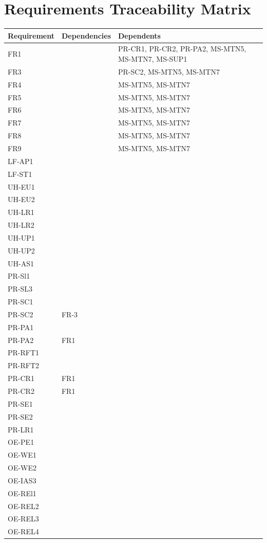 \documentclass[12pt]{article}
\begin{document}
\section{Requirements Traceability Matrix}

\begin{tabular}{|p{3cm}|p{3cm}|p{8cm}|}
\hline
\textbf{Requirement} & \textbf{Dependencies} & \textbf{Dependents}\\
\hline
FR1 & & PR-CR1, PR-CR2, PR-PA2, MS-MTN5, MS-MTN7, MS-SUP1\\
FR3 & & PR-SC2, MS-MTN5, MS-MTN7\\
FR4 & &MS-MTN5, MS-MTN7 \\
FR5 & & MS-MTN5, MS-MTN7\\
FR6 & & MS-MTN5, MS-MTN7\\
FR7 & & MS-MTN5, MS-MTN7\\
FR8 & & MS-MTN5, MS-MTN7\\
FR9 & & MS-MTN5, MS-MTN7\\
LF-AP1 & & \\
LF-ST1 & & \\
UH-EU1 & & \\
UH-EU2 & & \\
UH-LR1 & & \\
UH-LR2 & & \\
UH-UP1 & & \\
UH-UP2 & & \\
UH-AS1 & & \\
PR-Sl1 & & \\
PR-SL3 & & \\
PR-SC1 & & \\
PR-SC2 & FR-3& \\
PR-PA1 & & \\
PR-PA2 & FR1& \\
PR-RFT1& & \\
PR-RFT2& & \\
PR-CR1& FR1& \\
PR-CR2& FR1& \\
PR-SE1& & \\
PR-SE2& & \\
PR-LR1& & \\
OE-PE1& & \\
OE-WE1& & \\
OE-WE2& & \\
OE-IAS3& & \\
OE-REl1& & \\
OE-REL2& & \\
OE-REL3& & \\
OE-REL4& & \\
\hline
\end{tabular}
\end{document}
